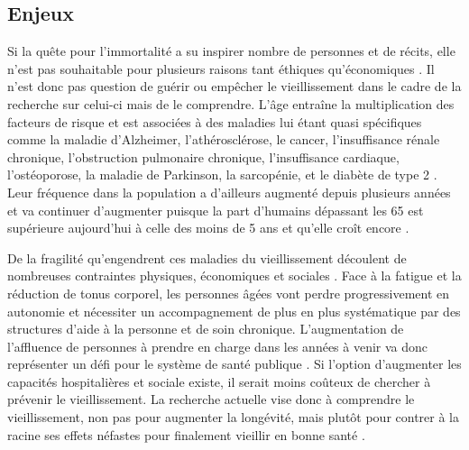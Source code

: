 



\subsection{Enjeux}

Si la quête pour l'immortalité a su inspirer nombre de personnes et de récits, elle n'est pas souhaitable pour plusieurs raisons tant éthiques qu'économiques \cite{Hayflick2000}. Il n'est donc pas question de guérir ou empêcher le vieillissement dans le cadre de la recherche sur celui-ci mais de le comprendre. L'âge entraîne la multiplication des facteurs de risque et est associées à des maladies lui étant quasi spécifiques comme la maladie d'Alzheimer, l'athérosclérose, le cancer, l'insuffisance rénale chronique, l'obstruction pulmonaire chronique, l'insuffisance cardiaque, l'ostéoporose, la maladie de Parkinson, la sarcopénie, et le diabète de type 2 \cite{Kubben2017}. Leur fréquence dans la population a d'ailleurs augmenté depuis plusieurs années et va continuer d'augmenter puisque la part d'humains dépassant les 65 est supérieure aujourd'hui à celle des moins de 5 ans et qu'elle croît encore \cite{Phillips2021Apr}. 

De la fragilité qu'engendrent ces maladies du vieillissement découlent de nombreuses contraintes physiques, économiques et sociales \cite{Blasimme2017Feb}. Face à la fatigue et la réduction de tonus corporel, les personnes âgées vont perdre progressivement en autonomie et nécessiter un accompagnement de plus en plus systématique par des structures d'aide à la personne et de soin chronique. L'augmentation de l'affluence de personnes à prendre en charge dans les années à venir va donc représenter un défi pour le système de santé publique \cite{Phillips2021Apr}. Si l'option d'augmenter les capacités hospitalières et sociale existe, il serait moins coûteux de chercher à prévenir le vieillissement. La recherche actuelle vise donc à comprendre le vieillissement, non pas pour augmenter la longévité, mais plutôt pour contrer à la racine ses effets néfastes pour finalement vieillir en bonne santé \cite{Ferrucci2020Feb}.




